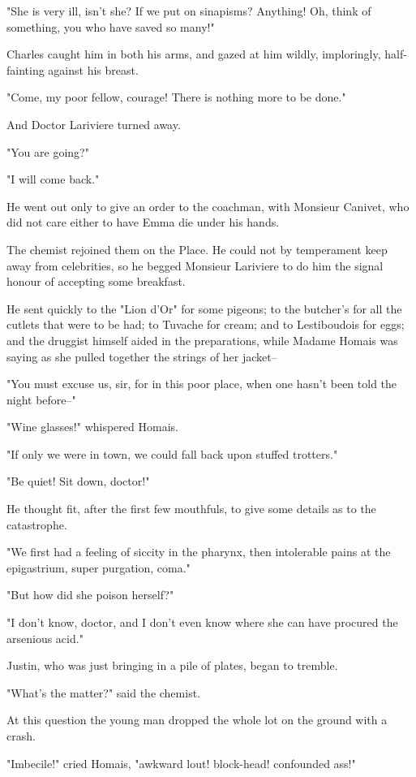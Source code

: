 \documentclass{tufte-book}
\begin{document}
"She is very ill, isn't she? If we put on sinapisms? Anything! Oh, think
of something, you who have saved so many!"

Charles caught him in both his arms, and gazed at him wildly,
imploringly, half-fainting against his breast.

"Come, my poor fellow, courage! There is nothing more to be done."

And Doctor Lariviere turned away.

"You are going?"

"I will come back."

He went out only to give an order to the coachman, with Monsieur
Canivet, who did not care either to have Emma die under his hands.

The chemist rejoined them on the Place. He could not by temperament keep
away from celebrities, so he begged Monsieur Lariviere to do him the
signal honour of accepting some breakfast.

He sent quickly to the "Lion d'Or" for some pigeons; to the butcher's
for all the cutlets that were to be had; to Tuvache for cream; and
to Lestiboudois for eggs; and the druggist himself aided in the
preparations, while Madame Homais was saying as she pulled together the
strings of her jacket--

"You must excuse us, sir, for in this poor place, when one hasn't been
told the night before--"

"Wine glasses!" whispered Homais.

"If only we were in town, we could fall back upon stuffed trotters."

"Be quiet! Sit down, doctor!"

He thought fit, after the first few mouthfuls, to give some details as
to the catastrophe.

"We first had a feeling of siccity in the pharynx, then intolerable
pains at the epigastrium, super purgation, coma."

"But how did she poison herself?"

"I don't know, doctor, and I don't even know where she can have procured
the arsenious acid."

Justin, who was just bringing in a pile of plates, began to tremble.

"What's the matter?" said the chemist.

At this question the young man dropped the whole lot on the ground with
a crash.

"Imbecile!" cried Homais, "awkward lout! block-head! confounded ass!"
\end{document}
